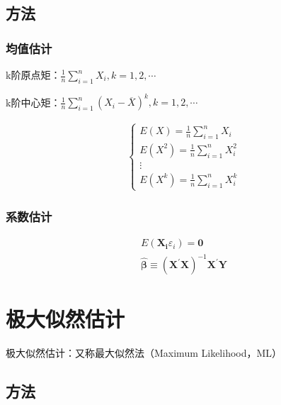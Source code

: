 \documentclass[12pt]{book}
\begin{document}
\subsection{方法}

\subsubsection{均值估计}

\par k阶原点矩：$\frac{1}{n}\sum_{i=1}^{n}{X_i}, k=1,2,\cdots$
\par k阶中心矩：$\frac{1}{n}\sum_{i=1}^{n}{(X_i-\overline{X})^k}, k=1,2,\cdots$

\begin{gather*}
    \begin{cases}
        E(X) = \frac{1}{n}\sum_{i=1}^{n}{X_i}     \\
        E(X^2) = \frac{1}{n}\sum_{i=1}^{n}{X_i^2} \\
        \vdots                                    \\
        E(X^k) = \frac{1}{n}\sum_{i=1}^{n}{X_i^k}
    \end{cases}
\end{gather*}

\subsubsection{系数估计}

\begin{gather*}
    E( \mathbf{X_i} \varepsilon_{i} ) =\mathbf{0} \\
    \hat{\bm{\beta}} \equiv  (\mathbf{X}^{\prime}\mathbf{X})^{-1} \mathbf{X}^{\prime} \mathbf{Y}
\end{gather*}










\section{极大似然估计}







极大似然估计：又称最大似然法（Maximum Likelihood，ML）

\subsection{方法}
\end{document}
